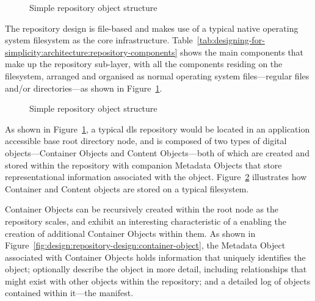 \tablespacing

\bodyspacing

\begin{figure}[t]
 \centering
 \framebox[\textwidth]{
 
 }
 \caption{Simple repository object structure}
 \label{fig:design:repository-design:repository-hierarchical-structure}
\end{figure}

The repository design is file-based and makes use of a typical native operating system filesystem as the core infrastructure. Table~\ref{tab:designing-for-simplicity:architecture:repository-components} shows the main components that make up the repository sub-layer, with all the components residing on the filesystem, arranged and organised as normal operating system files---regular files and/or directories---as shown in Figure~\ref{fig:design:repository-design:repository-hierarchical-structure}.

\begin{figure}[t]
 \centering
 \framebox[\textwidth]{
 
 }
 \caption{Simple repository object structure}
 \label{fig:design:repository-design:repository-object-structure}
\end{figure}

As shown in Figure~\ref{fig:design:repository-design:repository-hierarchical-structure}, a typical \gls{dls} repository would be located in an application accessible base root directory node, and is composed of two types of digital objects---Container Objects and Content Objects---both of which are created and stored within the repository with companion Metadata Objects that store representational information associated with the object. Figure~\ref{fig:design:repository-design:repository-object-structure} illustrates how Container and Content objects are stored on a typical filesystem.

Container Objects can be recursively created within the root node as the repository scales, and exhibit an interesting characteristic of a enabling the creation of additional Container Objects within them. As shown in Figure~\ref{fig:design:repository-design:container-object}, the Metadata Object associated with Container Objects holds information that uniquely identifies the object; optionally describe the object in more detail, including relationships that might exist with other objects within the repository; and a detailed log of objects contained within it---the manifest.

